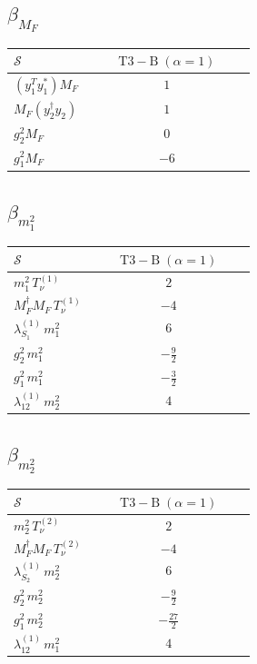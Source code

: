 \documentclass[9pt]{article}
\begin{document}
\subsection*{$ \beta_{M_F} $}
\begin{longtable}{@{}p{0.31\linewidth}c@{}}
\toprule
$\mathcal{S}$ & $ \mathrm{T3-B}\;(\alpha=1) $ \\
\midrule
$ (y_1^T y_1^*)M_F $ & $ 1 $ \\
$ M_F(y_2^\dagger y_2) $ & $ 1 $ \\
$ g_2^2M_F $ & $ 0 $ \\
$ g_1^2M_F $ & $ -6 $ \\
\bottomrule
\end{longtable}
\subsection*{$ \beta_{m_1^{2}} $}
\begin{longtable}{@{}p{0.31\linewidth}c@{}}
\toprule
$\mathcal{S}$ & $ \mathrm{T3-B}\;(\alpha=1) $ \\
\midrule
$ m_1^{2}\,T_{\nu}^{(1)} $ & $ 2 $ \\
$ M_F^\dagger M_F\,T_{\nu}^{(1)} $ & $ -4 $ \\
$ \lambda_{S_1}^{(1)}\,m_1^{2} $ & $ 6 $ \\
$ g_2^2\,m_1^{2} $ & $ - \frac{9}{2} $ \\
$ g_1^2\,m_1^{2} $ & $ - \frac{3}{2} $ \\
$ \lambda_{12}^{(1)}\,m_2^{2} $ & $ 4 $ \\
\bottomrule
\end{longtable}
\subsection*{$ \beta_{m_2^{2}} $}
\begin{longtable}{@{}p{0.31\linewidth}c@{}}
\toprule
$\mathcal{S}$ & $ \mathrm{T3-B}\;(\alpha=1) $ \\
\midrule
$ m_2^{2}\,T_{\nu}^{(2)} $ & $ 2 $ \\
$ M_F^\dagger M_F\,T_{\nu}^{(2)} $ & $ -4 $ \\
$ \lambda_{S_2}^{(1)}\,m_2^{2} $ & $ 6 $ \\
$ g_2^2\,m_2^{2} $ & $ - \frac{9}{2} $ \\
$ g_1^2\,m_2^{2} $ & $ - \frac{27}{2} $ \\
$ \lambda_{12}^{(1)}\,m_1^{2} $ & $ 4 $ \\
\bottomrule
\end{longtable}
\end{document}
